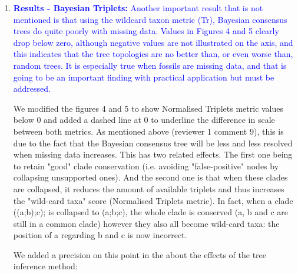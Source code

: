 \documentclass[12pt,letterpaper]{article}
\begin{document}
\begin{enumerate}



\item{\textcolor{blue}{\textbf{Results - Bayesian Triplets:} Another important result that is not mentioned is that using the wildcard taxon metric (Tr), Bayesian consensus trees do quite poorly with missing data.
Values in Figures 4 and 5 clearly drop below zero, although negative values are not illustrated on the axis, and this indicates that the tree topologies are no better than, or even worse than, random trees.
It is especially true when fossils are missing data, and that is going to be an important finding with practical application but must be addressed. }}

We modified the figures 4 and 5 to show Normalised Triplets metric values below 0 and added a dashed line at 0 to underline the difference in scale between both metrics.
As mentioned above (reviewer 1 comment 9), this is due to the fact that the Bayesian consensus tree will be less and less resolved when missing data increases.
This has two related effects.
The first one being to retain "good" clade conservation (i.e. avoiding "false-positive" nodes by collapsing unsupported ones).
And the second one is that when these clades are collapsed, it reduces the amount of available triplets and thus increases the "wild-card taxa" score (Normalised Triplets metric).
In fact, when a clade ((a;b);c); is collapsed to (a;b;c), the whole clade is conserved (a, b and c are still in a common clade) however they also all become wild-card taxa: the position of a regarding b and c is now incorrect.

We added a precision on this point in the about the effects of the tree inference method:


\end{enumerate}
\end{document}
